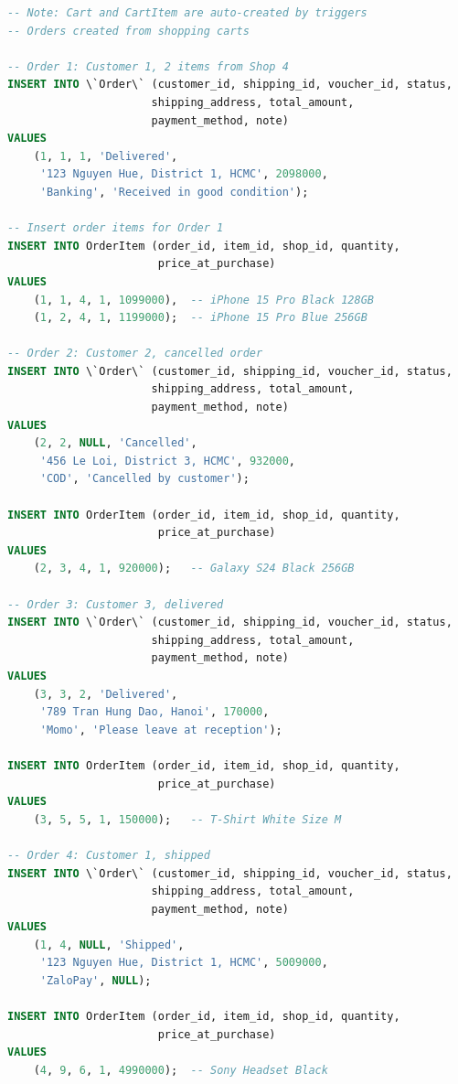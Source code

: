 \begin{lstlisting}[language=SQL, caption=Sample ORDER Insert, label=lst:insert_order]
-- Note: Cart and CartItem are auto-created by triggers
-- Orders created from shopping carts

-- Order 1: Customer 1, 2 items from Shop 4
INSERT INTO \`Order\` (customer_id, shipping_id, voucher_id, status,
                      shipping_address, total_amount, 
                      payment_method, note)
VALUES
    (1, 1, 1, 'Delivered',
     '123 Nguyen Hue, District 1, HCMC', 2098000,
     'Banking', 'Received in good condition');

-- Insert order items for Order 1
INSERT INTO OrderItem (order_id, item_id, shop_id, quantity, 
                       price_at_purchase)
VALUES
    (1, 1, 4, 1, 1099000),  -- iPhone 15 Pro Black 128GB
    (1, 2, 4, 1, 1199000);  -- iPhone 15 Pro Blue 256GB

-- Order 2: Customer 2, cancelled order
INSERT INTO \`Order\` (customer_id, shipping_id, voucher_id, status,
                      shipping_address, total_amount, 
                      payment_method, note)
VALUES
    (2, 2, NULL, 'Cancelled',
     '456 Le Loi, District 3, HCMC', 932000,
     'COD', 'Cancelled by customer');

INSERT INTO OrderItem (order_id, item_id, shop_id, quantity, 
                       price_at_purchase)
VALUES
    (2, 3, 4, 1, 920000);   -- Galaxy S24 Black 256GB

-- Order 3: Customer 3, delivered
INSERT INTO \`Order\` (customer_id, shipping_id, voucher_id, status,
                      shipping_address, total_amount, 
                      payment_method, note)
VALUES
    (3, 3, 2, 'Delivered',
     '789 Tran Hung Dao, Hanoi', 170000,
     'Momo', 'Please leave at reception');

INSERT INTO OrderItem (order_id, item_id, shop_id, quantity, 
                       price_at_purchase)
VALUES
    (3, 5, 5, 1, 150000);   -- T-Shirt White Size M

-- Order 4: Customer 1, shipped
INSERT INTO \`Order\` (customer_id, shipping_id, voucher_id, status,
                      shipping_address, total_amount, 
                      payment_method, note)
VALUES
    (1, 4, NULL, 'Shipped',
     '123 Nguyen Hue, District 1, HCMC', 5009000,
     'ZaloPay', NULL);

INSERT INTO OrderItem (order_id, item_id, shop_id, quantity, 
                       price_at_purchase)
VALUES
    (4, 9, 6, 1, 4990000);  -- Sony Headset Black
\end{lstlisting}

